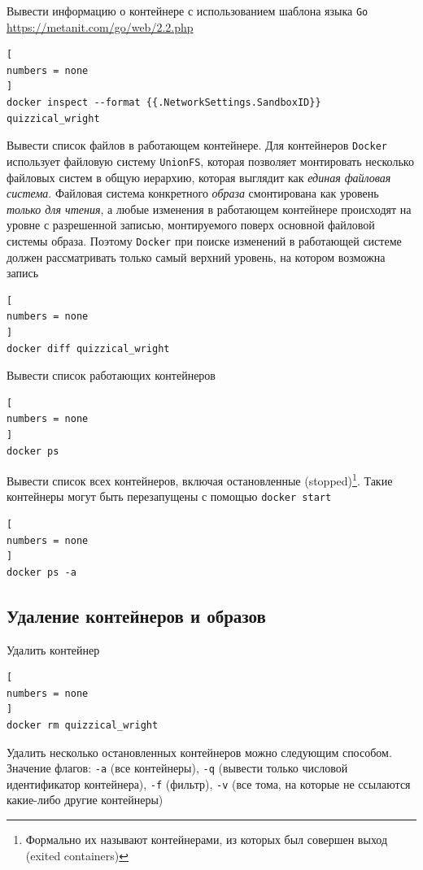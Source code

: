\documentclass[%
	11pt,
	a4paper,
	utf8,
		]{article}
\begin{document}
Вывести информацию о контейнере с использованием шаблона языка \texttt{Go} \url{https://metanit.com/go/web/2.2.php}

\begin{lstlisting}[
numbers = none
]
docker inspect --format {{.NetworkSettings.SandboxID}} quizzical_wright
\end{lstlisting}

Вывести список файлов в работающем контейнере. Для контейнеров \texttt{Docker} использует файловую систему \texttt{UnionFS}, которая позволяет монтировать несколько файловых систем в общую иерархию, которая выглядит как \emph{единая файловая система}. Файловая система конкретного \emph{образа} смонтирована как уровень \emph{только для чтения}, а любые изменения в работающем контейнере происходят на уровне с разрешенной записью, монтируемого поверх основной {файловой системы образа}. Поэтому \texttt{Docker} при поиске изменений в работающей системе должен рассматривать только самый верхний уровень, на котором возможна запись \cite{mouat:docker-2017}

\begin{lstlisting}[
numbers = none
]
docker diff quizzical_wright
\end{lstlisting}

Вывести список работающих контейнеров

\begin{lstlisting}[
numbers = none
]
docker ps
\end{lstlisting}

Вывести список всех контейнеров, включая остановленные (stopped)\footnote{Формально их называют контейнерами, из которых был совершен выход (exited containers)}. Такие контейнеры могут быть перезапущены с помощью \texttt{docker start}

\begin{lstlisting}[
numbers = none
]
docker ps -a
\end{lstlisting}

\subsection{Удаление контейнеров и образов}

Удалить контейнер 

\begin{lstlisting}[
numbers = none
]
docker rm quizzical_wright
\end{lstlisting}

Удалить несколько остановленных контейнеров можно следующим способом. Значение флагов: \texttt{-a} (все контейнеры), \texttt{-q} (вывести только числовой идентификатор контейнера), \texttt{-f} (фильтр), \texttt{-v} (все тома, на которые не ссылаются какие-либо другие контейнеры)
\end{document}
